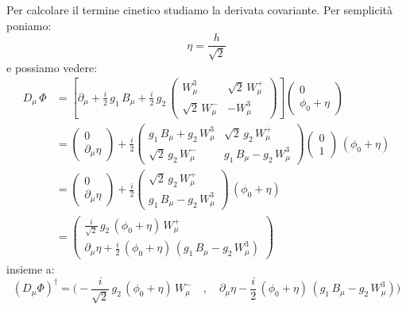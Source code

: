 Per calcolare il termine cinetico studiamo la derivata covariante. Per semplicità poniamo:
\begin{equation}
    \eta = \frac{h}{\sqrt{2}}
\end{equation}
e possiamo vedere:
\begin{align}
    D_\mu\, \Phi &= \left[ \partial_\mu + \frac{i}{2}\, g_1\, B_\mu + \frac{i}{2}\, g_2\, \begin{pmatrix}
        W_\mu^3 & \sqrt{2}\, W_\mu^+ \\
        \sqrt{2}\, W_\mu^- & -W_\mu^3
    \end{pmatrix} \right] \begin{pmatrix}
        0 \\
        \phi_0 + \eta
    \end{pmatrix} \\
    &= \begin{pmatrix}
        0 \\
        \partial_\mu\eta
    \end{pmatrix} + \frac{i}{2}\begin{pmatrix}
        g_1\, B_\mu + g_2\, W_\mu^3 & \sqrt{2}\, g_2\, W_\mu^+ \\
        \sqrt{2}\, g_2\, W_\mu^- & g_1\, B_\mu - g_2\, W_\mu^3
    \end{pmatrix}\begin{pmatrix}
        0 \\
        1
    \end{pmatrix}\, \left(\phi_0 + \eta\right) \\
    &= \begin{pmatrix}
        0 \\
        \partial_\mu\eta
    \end{pmatrix} + \frac{i}{2}\begin{pmatrix}
        \sqrt{2}\, g_2\, W_\mu^+ \\
        g_1\, B_\mu - g_2\, W_\mu^3
    \end{pmatrix}\, \left(\phi_0 + \eta\right) \\
    &= \begin{pmatrix}
        \frac{i}{\sqrt{2}}\, g_2\, \left(\phi_0 + \eta\right)\, W_\mu^+ \\
        \partial_\mu\eta + \frac{i}{2}\, \left(\phi_0 + \eta\right)\, \left(g_1\, B_\mu - g_2\, W_\mu^3\right)
    \end{pmatrix}
\end{align}
insieme a:
\begin{equation}
    \left(D_\mu\Phi\right)^\dagger = \Bigg(
        -\frac{i}{\sqrt{2}}\, g_2\, \left(\phi_0 + \eta\right)\, W_\mu^- \quad , \quad \partial_\mu\eta - \frac{i}{2}\, \left(\phi_0 + \eta\right)\, \left(g_1\, B_\mu - g_2\, W_\mu^3\right) \Bigg)
\end{equation}
